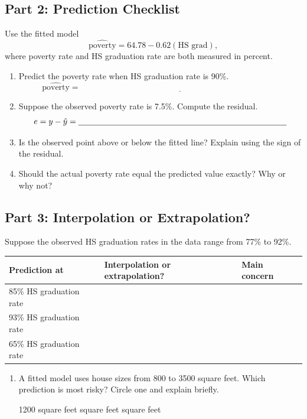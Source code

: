 \documentclass{article}
\newcommand{\blankline}[1]{\underline{\hspace{#1}}}
\begin{document}
\subsection*{Part 2: Prediction Checklist}
Use the fitted model
\[
\widehat{\text{poverty}} = 64.78 - 0.62(\text{HS grad}),
\]
where poverty rate and HS graduation rate are both measured in percent.

\begin{enumerate}[label={\bfseries (\Alph*)},itemsep=.8em]
\item Predict the poverty rate when HS graduation rate is 90\%.
\[
\widehat{\text{poverty}} = \blankline{4in}
\]
\item Suppose the observed poverty rate is 7.5\%. Compute the residual.
\[
e = y - \hat y = \blankline{3.5in}
\]
\item Is the observed point above or below the fitted line? Explain using the sign of the residual. \\[3em]
\item Should the actual poverty rate equal the predicted value exactly? Why or why not? \\[3em]
\end{enumerate}

\subsection*{Part 3: Interpolation or Extrapolation?}
Suppose the observed HS graduation rates in the data range from 77\% to 92\%.

\begin{center}
\renewcommand{\arraystretch}{1.45}
\begin{tabularx}{\textwidth}{p{4.2cm}p{4.1cm}X}
\toprule
\textbf{Prediction at} & \textbf{Interpolation or extrapolation?} & \textbf{Main concern} \\
\midrule
85\% HS graduation rate & & \\[1.7em]
93\% HS graduation rate & & \\[1.7em]
65\% HS graduation rate & & \\
\bottomrule
\end{tabularx}
\end{center}

\begin{enumerate}[label={\bfseries (\Alph*)},itemsep=.8em]
\item A fitted model uses house sizes from 800 to 3500 square feet. Which prediction is most risky? Circle one and explain briefly.
\begin{center}
1200 square feet  square feet  square feet
\end{center}
\vspace{3em}
\end{enumerate}
\end{document}

